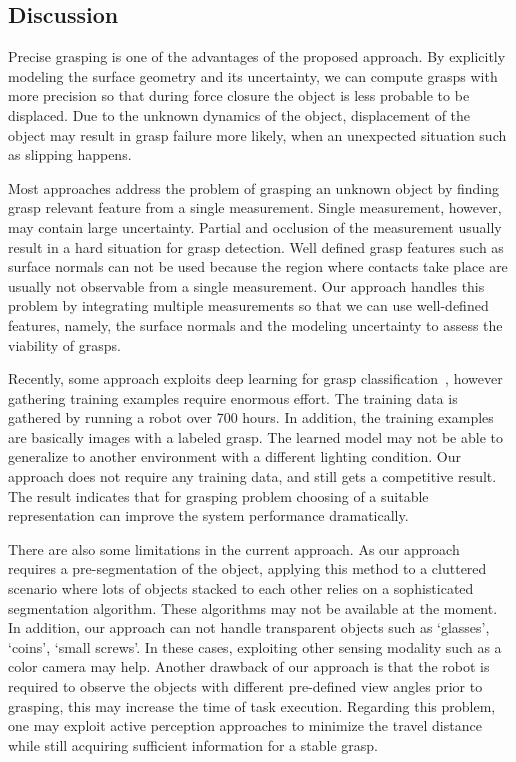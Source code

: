 \subsection{Discussion} 
Precise grasping is one of the advantages of the proposed approach. By explicitly modeling the surface geometry and its uncertainty, we can compute grasps with more precision so that during force closure the object is less probable to be displaced. Due to the unknown dynamics of the object, displacement of the object may result in grasp failure more likely, when an unexpected situation such as slipping happens.

Most approaches address the problem of grasping an  unknown object by finding grasp relevant feature from a single measurement. Single measurement, however, may contain large uncertainty. Partial and occlusion of the measurement usually result in a hard situation for grasp detection. Well defined grasp features such as surface normals can not be used because the region where contacts take place are usually not observable from a single measurement. Our approach handles this problem by integrating multiple measurements so that we can use well-defined features, namely, the surface normals and the modeling uncertainty to assess the viability of grasps. 

Recently, some approach exploits deep learning for grasp classification~\cite{Pinto2015}, however gathering training examples require enormous effort. The training data is gathered by running a robot over 700 hours. In addition, the training examples are basically images with a labeled grasp. The learned model may not be able to generalize to another environment with a different lighting condition. Our approach does not require any training data, and still gets a competitive result. The result indicates that for grasping problem  choosing of a suitable representation can improve the system performance dramatically. 

There are also some limitations in the current approach. As our approach requires a pre-segmentation of the  object, applying this  method to a cluttered scenario where lots of objects stacked to each other relies on a sophisticated segmentation algorithm. These algorithms may not be available at the moment. In addition, our approach can not handle transparent objects such as `glasses', `coins', `small screws'. In these cases, exploiting other sensing modality such as a color camera may help. Another drawback of our approach is that the robot is required to observe the objects with different pre-defined view angles prior to grasping, this may increase the time of task execution. Regarding this problem, one may exploit active perception approaches to minimize the travel distance while still acquiring sufficient information for a stable grasp. 

